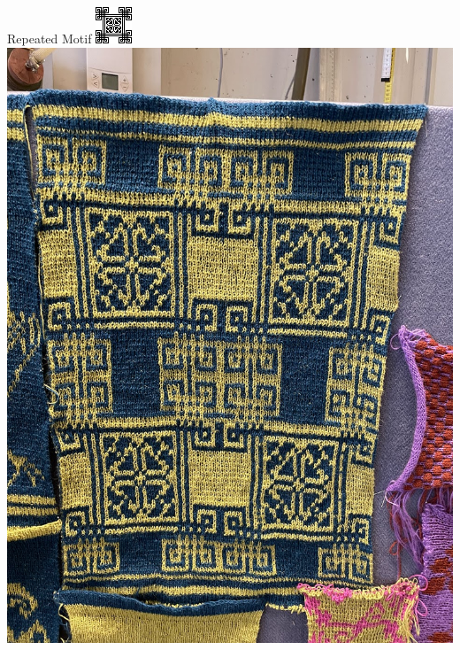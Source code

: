 \documentclass[
    NAME={Dr. Helga Ingimundardóttir},
    EMAIL={helgaingim@hi.is},
    FACULTY={Industrial Engineering},
    TITLE={HiDef Textiles: Reviving Tradition with Innovation},
    SUBTITLE={Empowering Creativity and Sustainability in Textile Production through Digital Transformation},
    SEMINAR={Reykjavík DataBeers},
    DATE={January 25, 2025},
    WIDE={true}
]{HI-LaTeX/hi-beamer}
\begin{document}
\begin{frame}{Repeated Motif}
\centering
    \includegraphics[height=.7\textheight]{include/thjms5898_268.png}
    \hspace{24pt}
    \includegraphics[height=.7\textheight]{include/repeat.jpg}
\end{frame}
\end{document}
